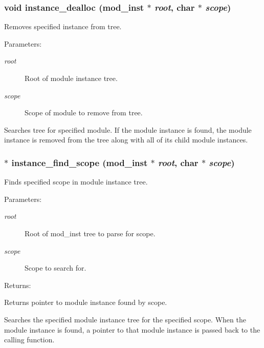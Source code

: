 \subsubsection{\setlength{\rightskip}{0pt plus 5cm}void instance\_\-dealloc ({\bf mod\_\-inst} $\ast$ {\em root}, char $\ast$ {\em scope})}\label{instance_8h_a4}


Removes specified instance from tree.

\begin{Desc}
\item[Parameters: ]\par
\begin{description}
\item[{\em 
root}]Root of module instance tree. \item[{\em 
scope}]Scope of module to remove from tree.\end{description}
\end{Desc}
Searches tree for specified module. If the module instance is found, the module instance is removed from the tree along with all of its child module instances. 
\subsubsection{$\ast$ instance\_\-find\_\-scope ({\bf mod\_\-inst} $\ast$ {\em root}, char $\ast$ {\em scope})}\label{instance_8h_a0}


Finds specified scope in module instance tree.

\begin{Desc}
\item[Parameters: ]\par
\begin{description}
\item[{\em 
root}]Root of mod\_\-inst tree to parse for scope. \item[{\em 
scope}]Scope to search for.\end{description}
\end{Desc}
\begin{Desc}
\item[Returns: ]\par
Returns pointer to module instance found by scope.\end{Desc}
Searches the specified module instance tree for the specified scope. When the module instance is found, a pointer to that module instance is passed back to the calling function. 
